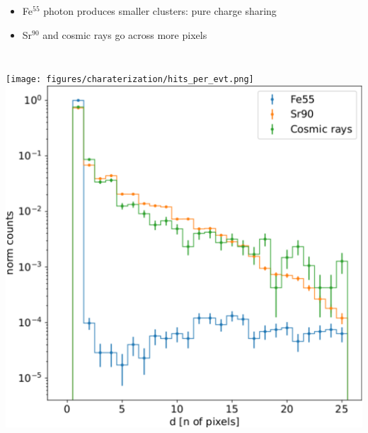 \begin{frame}
\begin{columns}
                \begin{itemize}
                    \item Fe$^{55}$ photon produces smaller clusters: pure charge sharing
                    \item Sr$^{90}$ and cosmic rays go across more pixels 
                \end{itemize}    
        \end{columns}
        \medskip
        \begin{columns}
            \texttt{[image: figures/charaterization/hits\_per\_evt.png]}            
            \includegraphics[width=1.\linewidth]{figures/charaterization/cluster_dimension.pdf}
        \end{columns}
    \end{frame}    


